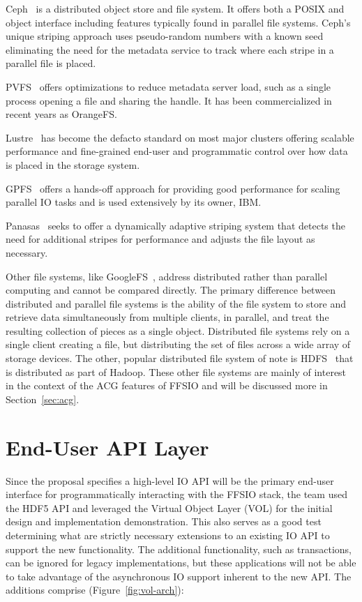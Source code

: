 \documentclass[conference]{IEEEtran}
\begin{document}
Ceph~\cite{weil:ceph} is a distributed object store and file system. It offers
both a POSIX and object interface including features typically found in parallel
file systems. Ceph's unique striping approach uses pseudo-random numbers with a
known seed eliminating the need for the metadata service to track where each
stripe in a parallel file is placed.

PVFS~\cite{carns:pvfs} offers optimizations to reduce metadata server load,
such as a single process opening a file and sharing the handle. It has been
commercialized in recent years as OrangeFS.

Lustre~\cite{braam:lustre-arch} has become the defacto standard on most major
clusters offering scalable performance and fine-grained end-user and
programmatic control over how data is placed in the storage system.

GPFS~\cite{schmuck:gpfs} offers a hands-off approach for providing good
performance for scaling parallel IO tasks and is used extensively by its owner,
IBM.

Panasas~\cite{panasas:architecture} seeks to offer a dynamically adaptive
striping system that detects the need for additional stripes for performance
and adjusts the file layout as necessary.

Other file systems, like GoogleFS~\cite{ghemawat:googlefs}, address distributed
rather than parallel computing and cannot be compared directly. The primary
difference between distributed and parallel file systems is the ability of the
file system to store and retrieve data simultaneously from multiple clients, in
parallel, and treat the resulting collection of pieces as a single object.
Distributed file systems rely on a single client creating a file, but
distributing the set of files across a wide array of storage devices. The
other, popular distributed file system of note is
HDFS~\cite{Shvachko:2010:hdfs} that is distributed as part of Hadoop. These
other file systems are mainly of interest in the context of the ACG features of
FFSIO and will be discussed more in Section~\ref{sec:acg}.

\section{End-User API Layer}
\label{sec:end-user}

Since the proposal specifies a high-level IO API will be the primary end-user
interface for programmatically interacting with the FFSIO stack, the team used
the HDF5 API and leveraged the Virtual Object Layer (VOL) for the initial
design and implementation demonstration. This also serves as a good test
determining what are strictly necessary extensions to an existing IO API to
support the new functionality.  The additional functionality, such as
transactions, can be ignored for legacy implementations, but these applications
will not be able to take advantage of the asynchronous IO support inherent to
the new API.  The additions comprise (Figure~\ref{fig:vol-arch}):
\end{document}
